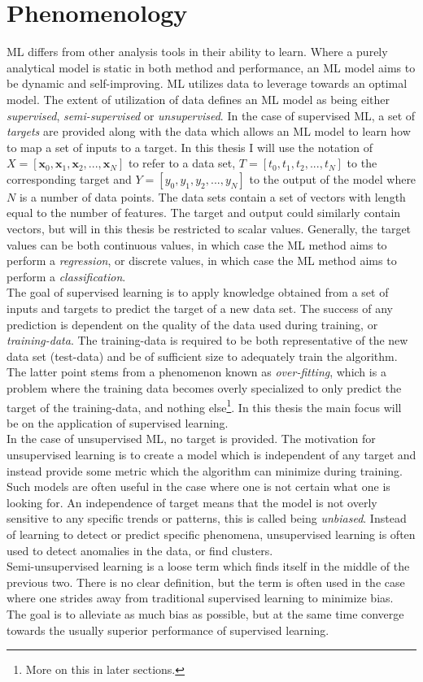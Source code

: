 \section{Phenomenology}\label{sec:MLPhen}
\ac{ML} differs from other analysis tools in their ability to learn. 
Where a purely analytical model is static in both method 
and performance, an \ac{ML} model aims to be dynamic and self-improving. 
\ac{ML} utilizes data to leverage towards an optimal
model. The extent of utilization of data defines an \ac{ML} model as being
either \emph{supervised}, \emph{semi-supervised} or \emph{unsupervised}. In the case 
of supervised \ac{ML}, a set of \emph{targets} are provided along with the
data which allows an \ac{ML} model to learn how to map a set of inputs to a target. In this 
thesis I will use the notation of $X = [\textbf{x}_0,\textbf{x}_1,\textbf{x}_2,...,\textbf{x}_N]$ to refer to 
a data set, $T = [t_0,t_1,t_2,...,t_N]$ to the corresponding target and $Y=[y_0,y_1,y_2,...,y_N]$ 
to the output of the model where $N$ is a number of data points. The data sets contain a set of vectors with length equal to the number 
of features. The target and output could similarly contain vectors, but will in this thesis be restricted 
to scalar values. Generally, the target values can be both continuous values, in which case the \ac{ML} 
method aims to perform a \emph{regression}, or discrete values, in which case the \ac{ML} method aims 
to perform a \emph{classification}. 
\\
The goal of supervised learning is to apply knowledge obtained from 
a set of inputs and targets to predict the target of a new data set. 
The success of any prediction is dependent on the quality of the 
data used during training, or \emph{training-data}. The training-data is required to 
be both representative of the new data set (test-data) and be of sufficient size to 
adequately train the algorithm. The latter point stems from a phenomenon known as \emph{over-fitting},
which is a problem where the training data becomes overly specialized to only predict 
the target of the training-data, and nothing else\footnote{More on this in later sections.}.
In this thesis the main focus will be on the application of supervised learning.
\\
In the case of unsupervised \ac{ML}, no target is provided. The motivation for unsupervised
learning is to create a model which is independent of any target and instead provide some metric 
which the algorithm can minimize during training. Such models are often useful in the case where 
one is not certain what one is looking for. An independence of target means that the model 
is not overly sensitive to any specific trends or patterns, this is called
being \emph{unbiased}. Instead of learning to detect or predict specific phenomena,
unsupervised learning is often used to detect anomalies in the data, or find clusters.
\\
Semi-unsupervised learning is a loose term which finds itself in the middle of the previous two. 
There is no clear definition, but the term is often used in the case where one strides away from 
traditional supervised learning to minimize bias. The goal is to alleviate as much bias as possible, 
but at the same time converge towards the usually superior performance of supervised learning.  